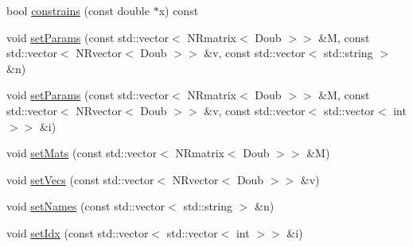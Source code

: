 \begin{DoxyCompactItemize}
\item 
bool \hyperlink{struct_p_r_p_s_evolution_1_1_models_1_1_whole_tomato_mk_i_i_i_abf53346cab12984807b3ccf85d1af106}{constrains} (const double $\ast$x) const 
\item 
void \hyperlink{struct_p_r_p_s_evolution_1_1_models_1_1_whole_tomato_mk_i_i_i_aeabd43e961b7a8d16d66b07382563a8b}{set\-Params} (const std\-::vector$<$ \-N\-Rmatrix$<$ \-Doub $>$$>$ \&\-M, const std\-::vector$<$ \-N\-Rvector$<$ \-Doub $>$$>$ \&v, const std\-::vector$<$ std\-::string $>$ \&n)
\item 
void \hyperlink{struct_p_r_p_s_evolution_1_1_models_1_1_whole_tomato_mk_i_i_i_a366c1b547c3546940ebe54574c6c3d5b}{set\-Params} (const std\-::vector$<$ \-N\-Rmatrix$<$ \-Doub $>$$>$ \&\-M, const std\-::vector$<$ \-N\-Rvector$<$ \-Doub $>$$>$ \&v, const std\-::vector$<$ std\-::vector$<$ int $>$$>$ \&i)
\item 
void \hyperlink{struct_p_r_p_s_evolution_1_1_models_1_1_whole_tomato_mk_i_i_i_a34af798bfed9a3fb55f7fb13d0dc73a8}{set\-Mats} (const std\-::vector$<$ \-N\-Rmatrix$<$ \-Doub $>$$>$ \&\-M)
\item 
void \hyperlink{struct_p_r_p_s_evolution_1_1_models_1_1_whole_tomato_mk_i_i_i_a318b3ba97451f3198fd6063cb3866c31}{set\-Vecs} (const std\-::vector$<$ \-N\-Rvector$<$ \-Doub $>$$>$ \&v)
\item 
void \hyperlink{struct_p_r_p_s_evolution_1_1_models_1_1_whole_tomato_mk_i_i_i_a9fff71f0fa970f7eeec99462c294968a}{set\-Names} (const std\-::vector$<$ std\-::string $>$ \&n)
\item 
void \hyperlink{struct_p_r_p_s_evolution_1_1_models_1_1_whole_tomato_mk_i_i_i_a4a137430e7f12069552212ff9347d03f}{set\-Idx} (const std\-::vector$<$ std\-::vector$<$ int $>$$>$ \&i)
\end{DoxyCompactItemize}



